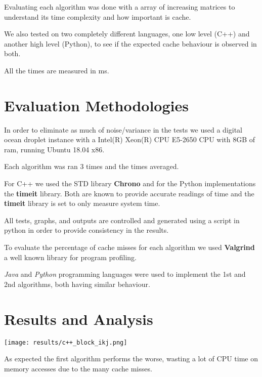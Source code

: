 \documentclass[a4paper]{article}
\begin{document}
Evaluating each algorithm was done with a array of increasing matrices to understand its time complexity and how important is cache. \par

We also tested on two completely different languages, one low level (C++) and another high level (Python), to see if the expected cache behaviour is observed in both.\par

All the times are measured in ms.


\section{Evaluation Methodologies}

In order to eliminate as much of noise/variance in the tests we used a digital ocean droplet instance with a Intel(R) Xeon(R) CPU E5-2650 CPU with 8GB of ram, running Ubuntu 18.04 x86. \par

Each algorithm was ran 3 times and the times averaged.\par
For C++ we used the STD library \textbf{Chrono} and for the Python implementations the \textbf{timeit} library. Both are known to provide accurate readings of time and the \textbf{timeit} library is set to only measure system time.\par

All tests, graphs, and outputs are controlled and generated using a script in python in order to provide consistency in the results. \par

To evaluate the percentage of cache misses for each algorithm we used \textbf{Valgrind} a well known library for program profiling.

\textit{Java} and \textit{Python} programming languages were used to implement the 1st and 2nd algorithms, both having similar behaviour.

\section{Results and Analysis}

\begin{center}
    \texttt{[image: results/c++\_block\_ikj.png]}\linebreak
\end{center}



As expected the first algorithm performs the worse, wasting a lot of CPU time on memory accesses due to the many cache misses.
\end{document}

